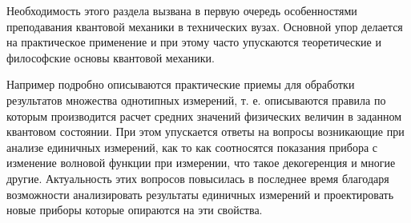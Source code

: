 Необходимость этого раздела вызвана в первую очередь особенностями
преподавания квантовой механики в технических вузах. Основной упор
делается на практическое применение и при этому часто упускаются
теоретические и философские основы квантовой механики.

Например подробно описываются практические приемы для обработки
результатов множества однотипных измерений, т. е. описываются правила
по которым производится расчет средних значений физических величин в
заданном квантовом состоянии. При этом упускается ответы на вопросы
возникающие при анализе единичных измерений, как то как соотносятся
показания прибора с изменение волновой функции при измерении, что
такое декогеренция и многие другие. Актуальность этих вопросов
повысилась в последнее время благодаря возможности анализировать
результаты единичных измерений и проектировать новые приборы которые
опираются на эти свойства.
